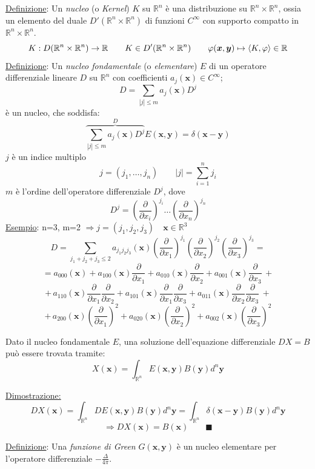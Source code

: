\documentclass[a4paper,11pt]{report}
\newcommand{\vect}[1]{\boldsymbol{#1}}
\newcommand{\R}{\mathbb{R}}
\newcommand{\Rn}{\mathbb{R}^n}
\newcommand{\x}{\boldsymbol{x}}
\newcommand{\y}{\boldsymbol{y}}
\begin{document}
\underline{Definizione}: Un \emph{nucleo} (o \emph{Kernel}) $K$ su $\Rn$ \`e una distribuzione su $\Rn \times \Rn$, ossia un elemento del duale $D'(\Rn \times \Rn)$ di funzioni $C^{\infty}$ con supporto compatto in $\Rn \times \Rn$.
\[
K:D(\Rn \times \Rn)\rightarrow\R \qquad K\in D'(\Rn \times \Rn) \qquad \varphi(\vect{x},\vect{y})\mapsto\Braket{K,\varphi}\in \R
\]
\underline{Definizione}: Un \emph{nucleo fondamentale} (o \emph{elementare}) $E$ di un operatore differenziale lineare $D$ su $\Rn$ con coefficienti $a_j(\vect{x})\in C^{\infty}$;
\[
D=\sum_{|j|\leq m}a_j(\vect{x})D^j
\]
\`e un nucleo, che soddisfa:
\begin{equation}
\overbrace{\sum_{|j|\leq m}a_j(\vect{x})D^j}^\text{$D$}E(\vect{x},\vect{y})=\delta(\vect{x}-\vect{y})
\end{equation}
$j$ \`e un indice multiplo
\[
j=(j_1,\dots ,j_n) \qquad |j|=\sum_{i=1}^n j_i
\]
$m$ \`e l'ordine dell'operatore differenziale $D^j$, dove
\[
D^j=\left(\frac{\partial}{\partial x_i}\right)^{j_i}\dots \left(\frac{\partial}{\partial x_n}\right)^{j_n}
\]
\underline{Esempio}: n=3, m=2 $\Rightarrow j=(j_1,j_2, j_3) \quad \vect{x} \in \R^3$
\[
D=\sum_{j_1+j_2+j_3\leq2} a_{j_1j_2j_3}(\vect{x})\left(\frac{\partial}{\partial x_1}\right)^{j_1}\left(\frac{\partial}{\partial x_2}\right)^{j_2}\left(\frac{\partial}{\partial x_3}\right)^{j_3}=
\]
\[
=a_{000}(\x)+a_{100}(\x)\frac{\partial}{\partial x_1}+a_{010}(\x)\frac{\partial}{\partial x_2}+a_{001}(\x)\frac{\partial}{\partial x_3}\,+
\]
\[
+\,a_{110}(\x)\frac{\partial}{\partial x_1}\frac{\partial}{\partial x_2}+a_{101}(\x)\frac{\partial}{\partial x_1}\frac{\partial}{\partial x_3}+a_{011}(\x)\frac{\partial}{\partial x_2}\frac{\partial}{\partial x_3}\,+
\]
\[
+\,a_{200}(\x)\left(\frac{\partial}{\partial x_1}\right)^2+a_{020}(\x)\left(\frac{\partial}{\partial x_2}\right)^2+a_{002}(\x)\left(\frac{\partial}{\partial x_3}\right)^2
\]

\medskip

Dato il nucleo fondamentale $E$, una soluzione dell'equazione differenziale $DX=B$ pu\`o essere trovata tramite:
\begin{equation}
X(\x)=\int_{\Rn}E(\x,\y)B(\y)d^n\y
\end{equation}

\underline{Dimostrazione:}
\[
DX(\x)=\int_{\Rn}DE(\x,\y)B(\y)d^n\y=\int_{\Rn}\delta(\x-\y)B(\y)d^n\y
\]
\[
\Rightarrow DX(\x)=B(\x) \qquad\blacksquare
\]

\underline{Definizione}: Una \emph{funzione di Green} $G(\x,\y)$ \`e un nucleo elementare per l'operatore differenziale $-\frac{\Delta}{4\pi}$.
\end{document}
